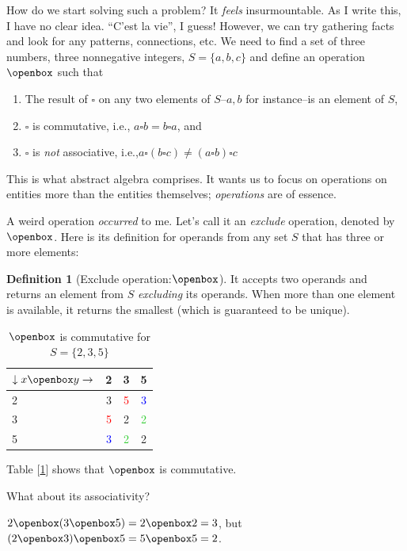 \documentclass[english,notitlepage,smartquotes]{hgbreport}
\theoremstyle{definition}
\newtheorem{definition}{Definition}
\theoremstyle{definition}
\theoremstyle{remark}
\theoremstyle{definition}
\theoremstyle{plain}
\theoremstyle{definition}
\begin{document}
How do we start solving such a problem? It \emph{feels} insurmountable. As I write this, I have no clear idea. ``C’est la vie'', I guess! However, we can try gathering facts and look for any patterns, connections, etc. We need to find a set of three numbers, three nonnegative integers, $S=\{a,b,c\}$ and define an operation $\openbox$ such that
\begin{enumerate}
\item The result of $\square$ on any two elements of $S$--$a,b$ for instance--is an element of $S$,
\item $\square$ is commutative, i.e., $a\square b= b\square a$, and
\item $\square$ is \emph{not} associative, i.e.,$a\square(b\square c)\ne (a\square b)\square c$
\end{enumerate}

This is what abstract algebra comprises. It wants us to focus on operations on entities more than the entities themselves; \emph{operations} are of essence.

A weird operation \emph{occurred} to me. Let's call it an \emph{exclude} operation, denoted by $\openbox$. Here is its definition for operands from any set $S$ that has three or more elements:

\begin{definition}[Exclude operation:$\openbox$]
It accepts two operands and returns an element from $S$ \emph{excluding} its operands. When more than one element is available, it returns the smallest (which is guaranteed to be unique).
\end{definition}

\begin{table}[h!]
\centering
\begin{tabular}{l|ccc}
$\downarrow x\openbox y\rightarrow$&2&3&5\\
\hline
2&3&{\textcolor{red}5}&{\textcolor{blue}3}\\
3&{\textcolor{red}5}&2&{\textcolor{LimeGreen}2}\\
5&{\textcolor{blue}3}&{\textcolor{LimeGreen}2}&2\\
\end{tabular}
\caption{$\openbox$ is commutative for $S=\{2,3,5\}$}
\label{tab:exclude}
\end{table}

Table [\ref{tab:exclude}] shows that $\openbox$ is commutative.

What about its associativity? 

$2\openbox(3\openbox 5)=2\openbox 2=3$, but $(2\openbox 3)\openbox 5=5\openbox 5=2$.
\end{document}
